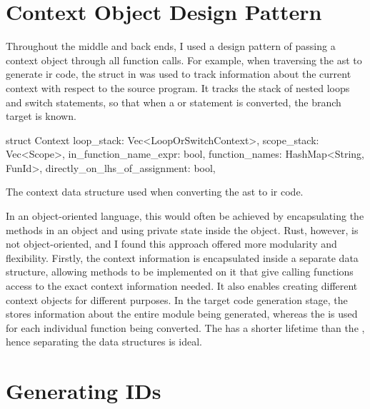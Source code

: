 \documentclass[../00-main.tex]{subfiles}
\begin{document}
\section{Context Object Design Pattern}\label{app:sec:context object design pattern}

Throughout the middle and back ends, I used a design pattern of passing a context object through all function calls.
For example, when traversing the \gls{ast} to generate \gls{ir} code, the  struct in  was used to track information about the current context with respect to the source program.
It tracks the stack of nested loops and switch statements, so that when a  or  statement is converted, the branch target is known.

\begin{listing}[t]
  \begin{RustListing}
    struct Context {
        loop_stack: Vec<LoopOrSwitchContext>,
        scope_stack: Vec<Scope>,
        in_function_name_expr: bool,
        function_names: HashMap<String, FunId>,
        directly_on_lhs_of_assignment: bool,
    }
  \end{RustListing}
  \caption{The context data structure used when converting the \gls{ast} to \gls{ir} code.}
  \label{lst:AST to IR context struct}
\end{listing}

In an object-oriented language, this would often be achieved by encapsulating the methods in an object and using private state inside the object.
Rust, however, is not object-oriented, and I found this approach offered more modularity and flexibility.
Firstly, the context information is encapsulated inside a separate data structure, allowing methods to be implemented on it that give calling functions access to the exact context information needed.
It also enables creating different context objects for different purposes.
In the target code generation stage, the  stores information about the entire module being generated, whereas the  is used for each individual function being converted.
The  has a shorter lifetime than the , hence separating the data structures is ideal.

\section{Generating IDs}\label{app:sec:generating IDs}
\end{document}
